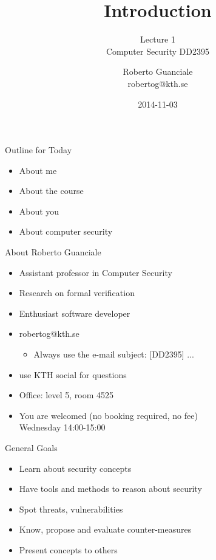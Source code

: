 \documentclass{beamer}
\title{Introduction}
\subtitle{Lecture 1 \\ Computer Security DD2395}
\author[R. Guanciale]{
  Roberto Guanciale\\
  robertog@kth.se
}
\date{2014-11-03}
\begin{document}
\begin{frame}[plain]
  \titlepage
\end{frame}

\begin{frame}{Outline for Today}
  \begin{itemize}
    \item About me
    \item About the course
    \item About you
    \item About computer security
  \end{itemize}
\end{frame}

\begin{frame}{About Roberto Guanciale}
  \begin{itemize}
    \item Assistant professor in Computer Security
    \item Research on formal verification
    \item Enthusiast software developer
    \item robertog@kth.se
      \begin{itemize}
      \item \alert{Always} use the e-mail subject: [DD2395] ...
      \end{itemize}
    \item use KTH social for questions
    \item Office: level 5, room 4525
    \item You are welcomed (no booking required, no fee)\\
      Wednesday 14:00-15:00
  \end{itemize}
\end{frame}

\begin{frame}{General Goals}
  \begin{itemize}
    \item Learn about security concepts
    \item Have tools and methods to reason about security
    \item Spot threats, vulnerabilities
    \item Know, propose and evaluate counter-measures
    \item Present concepts to others 
  \end{itemize}
\end{frame}
\end{document}
